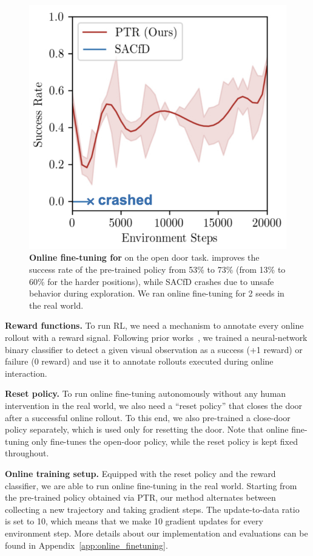 \begin{figure}
\vspace{-0.7cm}
\centering
\includegraphics[width=0.75\linewidth]{chapters/ptr/online-open-door.jpeg}
\vspace{-0.24cm}
\caption{\footnotesize{\label{fig:online_door} \textbf{Online fine-tuning for \ptrmethodname} on the open door task. \ptrmethodname improves the success rate of the pre-trained policy from 53\% to 73\% (from 13\% to 60\% for the harder positions), while SACfD crashes due to unsafe behavior during exploration. We ran \ptrmethodname online fine-tuning for 2 seeds in the real world.}}
\vspace{-0.6cm}
\end{figure}

\textbf{Reward functions.} To run RL, we need a mechanism to annotate every online rollout with a reward signal. Following prior works~\citep{singh2019, kalashnikov2021mt}, we trained a neural-network binary classifier to detect a given visual observation as a success (+1 reward) or failure (0 reward) and use it to annotate rollouts executed during online interaction. 

\textbf{Reset policy.} To run online fine-tuning autonomously without any human intervention in the real world, we also need a ``reset policy'' that closes the door after a successful online rollout. To this end, we also pre-trained a close-door policy separately, which is used only for resetting the door. Note that online fine-tuning only fine-tunes the open-door policy, while the reset policy is kept fixed throughout.


\textbf{Online training setup.} Equipped with the reset policy and the reward classifier, we are able to run online fine-tuning in the real world. Starting from the pre-trained policy obtained via PTR, our method alternates between collecting a new trajectory and taking gradient steps. The update-to-data ratio~\citep{2021arXiv210105982C} is set to 10, which means that we  make 10 gradient updates for every environment step. More details about our implementation and evaluations can be found in Appendix~\ref{app:online_finetuning}.


